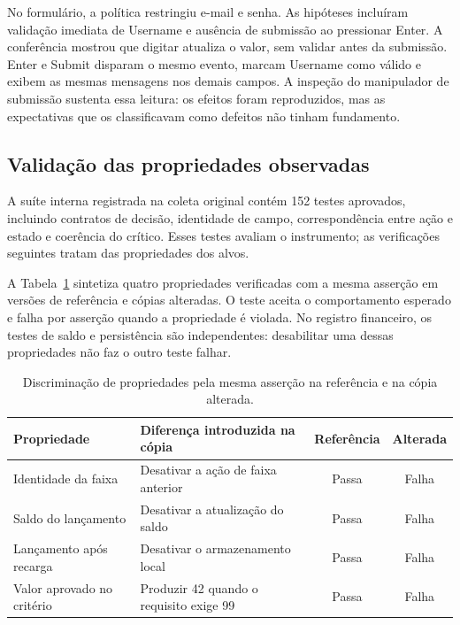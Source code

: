 \documentclass[12pt]{article}
\begin{document}
No formulário, a política restringiu e-mail e senha. As hipóteses incluíram validação imediata de Username e ausência de submissão ao pressionar Enter. A conferência mostrou que digitar atualiza o valor, sem validar antes da submissão. Enter e Submit disparam o mesmo evento, marcam Username como válido e exibem as mesmas mensagens nos demais campos. A inspeção do manipulador de submissão sustenta essa leitura: os efeitos foram reproduzidos, mas as expectativas que os classificavam como defeitos não tinham fundamento.

\subsection{Validação das propriedades observadas}
A suíte interna registrada na coleta original contém 152 testes aprovados, incluindo contratos de decisão, identidade de campo, correspondência entre ação e estado e coerência do crítico. Esses testes avaliam o instrumento; as verificações seguintes tratam das propriedades dos alvos.

A Tabela~\ref{tab:regression} sintetiza quatro propriedades verificadas com a mesma asserção em versões de referência e cópias alteradas. O teste aceita o comportamento esperado e falha por asserção quando a propriedade é violada. No registro financeiro, os testes de saldo e persistência são independentes: desabilitar uma dessas propriedades não faz o outro teste falhar.

\begin{table}[ht]
\centering
\caption{Discriminação de propriedades pela mesma asserção na referência e na cópia alterada.}
\label{tab:regression}
\small
\begin{tabular}{>{\raggedright\arraybackslash}p{4.2cm}>{\raggedright\arraybackslash}p{5.7cm}cc}
\toprule
Propriedade & Diferença introduzida na cópia & Referência & Alterada\\
\midrule
Identidade da faixa & Desativar a ação de faixa anterior & Passa & Falha\\
Saldo do lançamento & Desativar a atualização do saldo & Passa & Falha\\
Lançamento após recarga & Desativar o armazenamento local & Passa & Falha\\
Valor aprovado no critério & Produzir 42 quando o requisito exige 99 & Passa & Falha\\
\bottomrule
\end{tabular}
\end{table}
\end{document}
